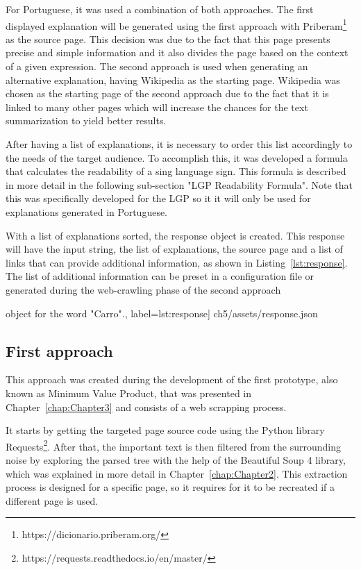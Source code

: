For Portuguese, it was used a combination of both approaches.
The first displayed explanation will be generated using the first approach with Priberam\footnote{https://dicionario.priberam.org/} as the source page.
This decision was due to the fact that this page presents precise and simple information and it also divides the page based on the context of a given expression.
The second approach is used when generating an alternative explanation, having Wikipedia as the starting page.
Wikipedia was chosen as the starting page of the second approach due to the fact that it is linked to many other pages which will increase the chances for the text summarization to yield better results.

After having a list of explanations, it is necessary to order this list accordingly to the needs of the target audience.
To accomplish this, it was developed a formula that calculates the readability of a sing language sign.
This formula is described in more detail in the following sub-section "LGP Readability Formula".
Note that this was specifically developed for the \gls{LGP} so it it will only be used for explanations generated in Portuguese.

With a list of explanations sorted, the response object is created.
This response will have the input string, the list of explanations, the source page and a list of links that can provide additional information, as shown in Listing~\ref{lst:response}.
The list of additional information can be preset in a configuration file or generated during the web-crawling phase of the second approach

\begin{center}
\begin{minipage}{0.95\linewidth}
 object for the word "Carro".,
label=lst:response]
{ch5/assets/response.json}
\end{minipage}
\end{center}

\subsection{First approach}

This approach was created during the development of the first prototype, also known as Minimum Value Product, that was presented in Chapter~\ref{chap:Chapter3} and consists of a web scrapping process.

It starts by getting the targeted page source code using the Python library Requests\footnote{https://requests.readthedocs.io/en/master/}.
After that, the important text is then filtered from the surrounding noise by exploring the parsed tree with the help of the Beautiful Soup 4 library, which was explained in more detail in Chapter~\ref{chap:Chapter2}.
This extraction process is designed for a specific page, so it requires for it to be recreated if a different page is used.

